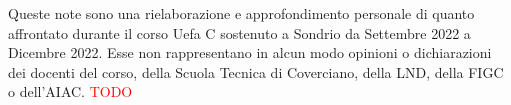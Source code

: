 Queste note sono una rielaborazione e approfondimento personale di quanto affrontato durante il corso Uefa C sostenuto a Sondrio da Settembre 2022 a Dicembre 2022.
Esse non rappresentano in alcun modo opinioni o dichiarazioni dei docenti del corso, della Scuola Tecnica di Coverciano, della LND, della FIGC o dell'AIAC. \textcolor{red}{TODO}

